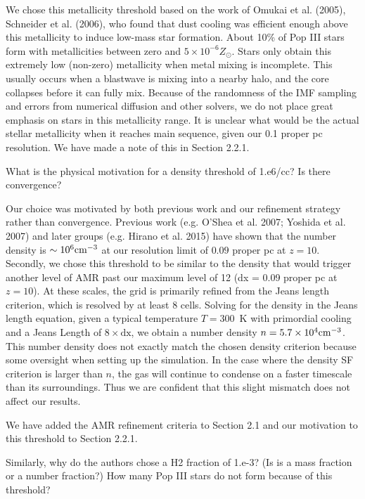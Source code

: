 \documentclass[11pt]{article}
\newenvironment{referee}[1][]{%
    \ignorespaces%
    \begin{mdframed}[style=myquotestyle,#1]%
}{%
    \end{mdframed}%
    \ignorespacesafterend%
}%
\begin{document}
We chose this metallicity threshold based on the work of Omukai et al. (2005), Schneider et al. (2006), who found that dust cooling was efficient enough above this metallicity to induce low-mass star formation. About 10\% of Pop III stars form with metallicities between zero and $5 \times 10^{-6} Z_\odot$.  Stars only obtain this extremely low (non-zero) metallicity when metal mixing is incomplete.  This usually occurs when a blastwave is mixing into a nearby halo, and the core collapses before it can fully mix.  Because of the randomness of the IMF sampling and errors from numerical diffusion and other solvers, we do not place great emphasis on stars in this metallicity range.  It is unclear what would be the actual stellar metallicity when it reaches main sequence, given our 0.1 proper pc resolution.  We have made a note of this in Section 2.2.1.

\begin{referee}
What is the physical motivation for a density threshold of 1.e6/cc? Is there convergence?
\end{referee}

Our choice was motivated by both previous work and our refinement strategy rather than convergence. Previous work (e.g. O'Shea et al. 2007; Yoshida et al. 2007) and later groups (e.g. Hirano et al. 2015) have shown that the number density is $\sim 10^6 \cubecm$ at our resolution limit of $0.09$ proper pc at $z=10$.  Secondly, we chose this threshold to be similar to the density that would trigger another level of AMR past our maximum level of 12 (dx = 0.09 proper pc at $z=10$).  At these scales, the grid is primarily refined from the Jeans length criterion, which is resolved by at least 8 cells.  Solving for the density in the Jeans length equation, given a typical temperature $T=300$~K with primordial cooling and a Jeans Length of $8 \times \textrm{dx}$, we obtain a number density $n = 5.7 \times 10^4 \cubecm$.  This number density does not exactly match the chosen density criterion because some oversight when setting up the simulation.  In the case where the density SF criterion is larger than $n$, the gas will continue to condense on a faster timescale than its surroundings.  Thus we are confident that this slight mismatch does not affect our results.

We have added the AMR refinement criteria to Section 2.1 and our motivation to this threshold to Section 2.2.1.

\begin{referee}
Similarly, why do the authors chose a H2 fraction of 1.e-3? (Is is a mass fraction or a number fraction?) How many Pop III stars do not form because of this threshold?
\end{referee}
\end{document}

